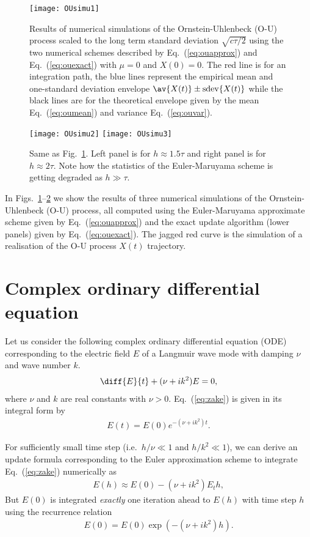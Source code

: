 \documentclass[10pt,a4paper]{article}
\newcommand{\eq}[1]{Eq.~(\ref{#1})}
\newcommand{\fig}[1]{Fig.~\ref{#1}}
\newcommand{\figs}[2]{Figs.~\ref{#1}--\ref{#2}}
\newcommand{\sdev}[1]{\ensuremath{\mathop{\mathrm{sdev}}\{#1\}}}
\newcommand{\OU}{\renewcommand{\OU}{O-U\xspace}Ornstein-Uhlenbeck (O-U)\xspace}
\newcommand{\ODE}{\renewcommand{\ODE}{ODE\xspace}ordinary differential equation (ODE)\xspace}
\begin{document}
\begin{figure}[ht]
\centering\texttt{[image: OUsimu1]}
\caption{Results of numerical simulations of the \OU process scaled to the
long term standard deviation $\sqrt{c\tau/2}$ using the two numerical
schemes described by \eq{eq:ouapprox} and \eq{eq:ouexact} with $\mu=0$
and $X(0)=0$. The red line is for an integration path, the blue lines
represent the empirical mean and one-standard deviation envelope 
$\av{X(t)}\pm\sdev{X(t)}$ while the black lines
are for the theoretical envelope given by the mean \eq{eq:oumean} and
variance \eq{eq:ouvar}.  }
\label{fig:OUsimu1}
\end{figure}

\begin{figure}[ht]
\centering
\texttt{[image: OUsimu2]}
\texttt{[image: OUsimu3]}
\caption{Same as \fig{fig:OUsimu1}. Left panel is for $h\approx1.5\tau$
and right panel is for $h\approx2\tau$. Note how the statistics of 
the Euler-Maruyama scheme is getting degraded as $h\gg\tau$. }
\label{fig:OUsimu2}
\end{figure}

In \figs{fig:OUsimu1}{fig:OUsimu2} we show the results of three numerical
simulations of the \OU process, all computed using the 
Euler-Maruyama approximate scheme given by \eq{eq:ouapprox} and the
exact update algorithm (lower panels) given by \eq{eq:ouexact}. The jagged
red curve is the simulation of a realisation of the \OU
process $X(t)$ trajectory.

\section{Complex ordinary differential equation}

Let us consider the following complex \ODE corresponding to the electric
field $E$ of a Langmuir wave mode with damping $\nu$ and wave number $k$.
\begin{align}
\diff{E}{t}+(\nu+ik^2) E = 0, \label{eq:zake}
\end{align}
where $\nu$ and $k$ are real constants with $\nu>0$. \eq{eq:zake} is given in
its integral form by
\begin{align}
E(t) = E(0)e^{-(\nu{+}ik^2)t}.
\end{align}

For sufficiently small time step (i.e.\ $h/\nu\ll1$ and $h/k^2\ll1$), we can
derive an update formula \citep{gillespie:1996a} corresponding to the
Euler approximation scheme to integrate \eq{eq:zake} numerically as
\begin{align}
E(h) \approx E(0) -(\nu+ik^2) E_t h, \label{eq:Ekeuler}
\end{align}
But $E(0)$ is integrated \emph{exactly} one iteration ahead to $E(h)$ with
time step $h$  using the recurrence relation
\begin{align}
E(0) = E(0)\exp\left(-(\nu+ik^2)h\right).
\label{eq:Eknum}
\end{align}
\end{document}
